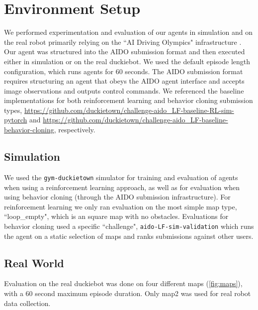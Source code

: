 \documentclass{article}
\begin{document}
\section{Environment Setup}

We performed experimentation and evaluation of our agents in simulation and on the real robot primarily relying on the ``AI Driving Olympics" infrastructure \cite{zilly2019ai}. Our agent was structured into the AIDO submission format and then executed either in simulation or on the real duckiebot. We used the default episode length configuration, which runs agents for 60 seconds. The AIDO submission format requires structuring an agent that obeys the AIDO agent interface and accepts image observations and outputs control commands. We referenced the baseline implementations for both reinforcement learning and behavior cloning submission types, \url{https://github.com/duckietown/challenge-aido_LF-baseline-RL-sim-pytorch} and \url{https://github.com/duckietown/challenge-aido_LF-baseline-behavior-cloning}, respectively.

\subsection{Simulation}

We used the \texttt{gym-duckietown} simulator \cite{gym_duckietown} for training and evaluation of agents when using a reinforcement learning approach, as well as for evaluation when using behavior cloning (through the AIDO submission infrastructure). For reinforcement learning we only ran evaluation on the most simple map type, ``loop\_empty", which is an square map with no obstacles. Evaluations for behavior cloning used a specific ``challenge", \texttt{aido-LF-sim-validation} which runs the agent on a static selection of maps and ranks submissions against other users.

\subsection{Real World}

Evaluation on the real duckiebot was done on four different maps (\ref{fig:maps}), with a 60 second maximum episode duration. Only map2 was used for real robot data collection.
\end{document}
